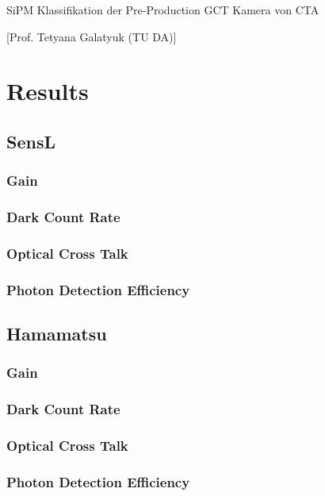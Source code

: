 \documentclass[article,type=msc,colorback,accentcolor=tud9c]{tudthesis}
\begin{document}
    {SiPM Klassifikation der Pre-Production GCT Kamera von CTA}
  \author{Ben Gebhardt}
  [Prof. Tetyana Galatyuk (TU DA)]
  \dateofexam{\today}{\today}
  \makethesistitle

  \section{Results}
     \subsection{SensL}
     \subsubsection{Gain}
     \subsubsection{Dark Count Rate}
     \subsubsection{Optical Cross Talk}
     \subsubsection{Photon Detection Efficiency}
     \subsection{Hamamatsu}
     \subsubsection{Gain}
     \subsubsection{Dark Count Rate}
     \subsubsection{Optical Cross Talk}
     \subsubsection{Photon Detection Efficiency}
\end{document}
